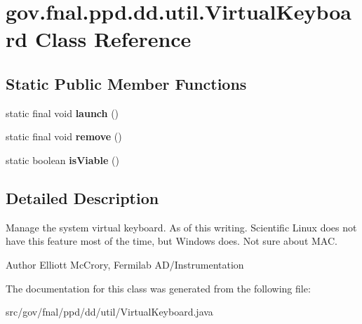 \hypertarget{classgov_1_1fnal_1_1ppd_1_1dd_1_1util_1_1VirtualKeyboard}{\section{gov.\-fnal.\-ppd.\-dd.\-util.\-Virtual\-Keyboard Class Reference}
\label{classgov_1_1fnal_1_1ppd_1_1dd_1_1util_1_1VirtualKeyboard}
}
\subsection*{Static Public Member Functions}
\begin{DoxyCompactItemize}
\item 
\hypertarget{classgov_1_1fnal_1_1ppd_1_1dd_1_1util_1_1VirtualKeyboard_a2e4127247571b047a3f531f2b8875db6}{static final void {\bfseries launch} ()}\label{classgov_1_1fnal_1_1ppd_1_1dd_1_1util_1_1VirtualKeyboard_a2e4127247571b047a3f531f2b8875db6}

\item 
\hypertarget{classgov_1_1fnal_1_1ppd_1_1dd_1_1util_1_1VirtualKeyboard_af8fa0153cbc34c2522b9c1f934c2d02f}{static final void {\bfseries remove} ()}\label{classgov_1_1fnal_1_1ppd_1_1dd_1_1util_1_1VirtualKeyboard_af8fa0153cbc34c2522b9c1f934c2d02f}

\item 
\hypertarget{classgov_1_1fnal_1_1ppd_1_1dd_1_1util_1_1VirtualKeyboard_aad08082770cb80392d9acd7d21e5245c}{static boolean {\bfseries is\-Viable} ()}\label{classgov_1_1fnal_1_1ppd_1_1dd_1_1util_1_1VirtualKeyboard_aad08082770cb80392d9acd7d21e5245c}

\end{DoxyCompactItemize}


\subsection{Detailed Description}
Manage the system virtual keyboard. As of this writing. Scientific Linux does not have this feature most of the time, but Windows does. Not sure about M\-A\-C.

\begin{DoxyAuthor}{Author}
Elliott Mc\-Crory, Fermilab A\-D/\-Instrumentation 
\end{DoxyAuthor}


The documentation for this class was generated from the following file\-:\begin{DoxyCompactItemize}
\item 
src/gov/fnal/ppd/dd/util/Virtual\-Keyboard.\-java\end{DoxyCompactItemize}
